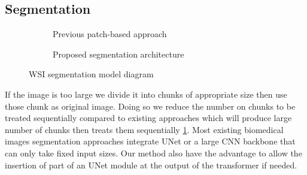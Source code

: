 \documentclass[review]{cvpr}
\begin{document}
\subsection{Segmentation}
\begin{figure}[h]
    \centering
    \begin{subfigure}{0.5\textwidth}
        \centering
        \caption{Previous patch-based approach}
        \label{fig:prev}
    \end{subfigure}
    \begin{subfigure}{0.5\textwidth}
        \centering
        \caption{Proposed segmentation architecture}
        \label{fig:prop}
    \end{subfigure}
\caption{WSI segmentation model diagram}
\label{fig:seg}
\end{figure}

If the image is too large we divide it into chunks of appropriate size then use those chunk as original image. Doing so we reduce the number on chunks to be treated sequentially compared to existing approaches which will produce large number of chunks then treats them sequentially \ref{fig:prev}. Most existing biomedical images segmentation approaches integrate UNet\cite{ronneberger2015unet} or a large CNN backbone that can only take fixed input sizes. Our method also have the advantage to allow the insertion of part of an UNet module at the output of the transformer if needed.
\end{document}
